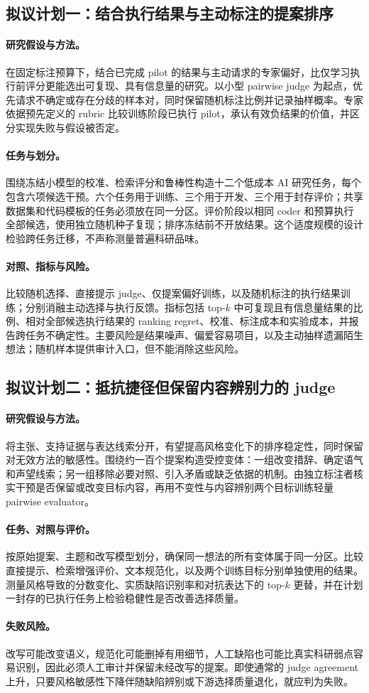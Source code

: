 \subsection{拟议计划一：结合执行结果与主动标注的提案排序}

\paragraph{研究假设与方法。}
在固定标注预算下，结合已完成 pilot 的结果与主动请求的专家偏好，比仅学习执行前评分更能选出可复现、具有信息量的研究。以小型 pairwise judge 为起点，优先请求不确定或存在分歧的样本对，同时保留随机标注比例并记录抽样概率。专家依据预先定义的 rubric 比较训练阶段已执行 pilot，承认有效负结果的价值，并区分实现失败与假设被否定。

\paragraph{任务与划分。}
围绕冻结小模型的校准、检索评分和鲁棒性构造十二个低成本 AI 研究任务，每个包含六项候选干预。六个任务用于训练、三个用于开发、三个用于封存评价；共享数据集和代码模板的任务必须放在同一分区。评价阶段以相同 coder 和预算执行全部候选，使用独立随机种子复现；排序冻结前不开放结果。这个适度规模的设计检验跨任务迁移，不声称测量普遍科研品味。

\paragraph{对照、指标与风险。}
比较随机选择、直接提示 judge、仅提案偏好训练，以及随机标注的执行结果训练；分别消融主动选择与执行反馈。指标包括 top-$k$ 中可复现且有信息量结果的比例、相对全部候选执行结果的 ranking regret、校准、标注成本和实验成本，并报告跨任务不确定性。主要风险是结果噪声、偏爱容易项目，以及主动抽样遗漏陌生想法；随机样本提供审计入口，但不能消除这些风险。

\subsection{拟议计划二：抵抗捷径但保留内容辨别力的 judge}

\paragraph{研究假设与方法。}
将主张、支持证据与表达线索分开，有望提高风格变化下的排序稳定性，同时保留对无效方法的敏感性。围绕约一百个提案构造受控变体：一组改变措辞、确定语气和声望线索；另一组移除必要对照、引入矛盾或缺乏依据的机制。由独立标注者核实干预是否保留或改变目标内容，再用不变性与内容辨别两个目标训练轻量 pairwise evaluator。

\paragraph{任务、对照与评价。}
按原始提案、主题和改写模型划分，确保同一想法的所有变体属于同一分区。比较直接提示、检索增强评价、文本规范化，以及两个训练目标分别单独使用的结果。测量风格导致的分数变化、实质缺陷识别率和对抗表达下的 top-$k$ 更替，并在计划一封存的已执行任务上检验稳健性是否改善选择质量。

\paragraph{失败风险。}
改写可能改变语义，规范化可能删掉有用细节，人工缺陷也可能比真实科研弱点容易识别，因此必须人工审计并保留未经改写的提案。即使通常的 judge agreement 上升，只要风格敏感性下降伴随缺陷辨别或下游选择质量退化，就应判为失败。
